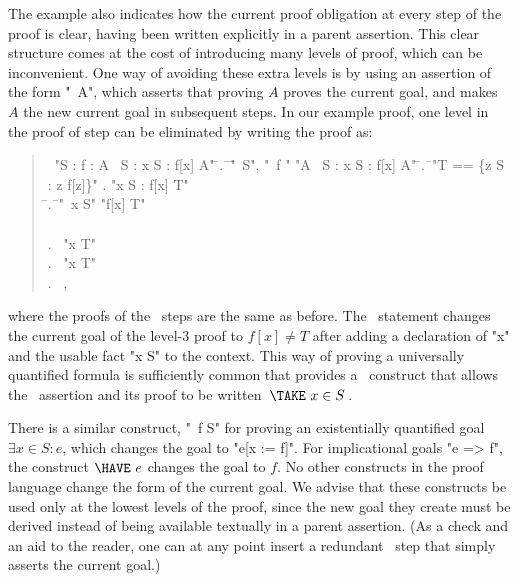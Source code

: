\documentclass[a4paper]{easychair}
\begin{document}
The example also indicates how the current proof obligation at every
step of the proof is clear, having been written explicitly in a parent
assertion.  This clear structure comes at the cost of introducing many
levels of proof, which can be inconvenient.  One way of avoiding these
extra levels is by using an assertion of the form "\SUFFICES\ A",
which asserts that proving $A$ proves the current goal, and makes $A$
the new current goal in subsequent steps.  In our example proof, one
level in the proof of step  can be eliminated by writing the proof
as:
\begin{quote} \small
  \begin{tabbing}
    \THEOREM\ "\forall S : \forall f \in [S -> \SUBSET\ S] : \exists A \in \SUBSET\ S : \forall x \in S : f[x] \neq A" \kill
    \PROOF \kill
    \LSP \= .\ \= \ASSUME \= "\NEW\ S", \kill
         \>        \>         \> "\NEW\ f \in [S -> \SUBSET\ S]" \kill
         \>        \> \PROVE "\exists A \in \SUBSET\ S : \forall x \in S : f[x] \neq A" \kill
         \>        \> \PROOF \kill
         \> \hspace{1em} \= .\ \= \DEFINE "T == \{z \in S : z \notin f[z]\}" \kill
         \>        \> .  \> "\forall x \in S : f[x] \neq T" \\
         \>        \>  \hspace{1em} \= .\ \= \SUFFICES \ASSUME "\NEW\ x \in S" \PROVE "f[x] \neq T" \\
         \>        \>        \> \hspace{1em} \PROOF \OBVIOUS \\
         \>        \>        \> .\ \> \CASE "x \in T" \\
         \>        \>        \> .\ \> \CASE "x \notin T" \\
         \>        \>        \> .\ \> \QED \BY {}, 
  \end{tabbing}
\end{quote}
where the proofs of the \CASE\ steps are the same as before.  The
\SUFFICES\ statement changes the current goal of the level-3 proof to
$f[x]\neq T$ after adding a declaration of "x" and the usable fact "x
\in S" to the context. This way of proving a universally quantified
formula is sufficiently common that \tlatwo provides a \TAKE\
construct that allows the \SUFFICES\ assertion  and its \OBVIOUS
proof to be written \mbox{\,$\TAKE\ x \in S$\,}. 

There is a similar construct, "\WITNESS\ f \in S" for proving an
existentially quantified goal $\exists x\in S: e$, which changes the
goal to "e[x := f]".
For implicational goals "e => f", the construct $\HAVE\ e$ changes the
goal to $f$.  No other constructs in the \tlatwo proof language change
the form of the current goal. We advise that these constructs be used
only at the lowest levels of the proof, since the new goal they create
must be derived instead of being available textually in a parent
assertion.  (As a check and an aid to the reader, one can at any point
insert a redundant \SUFFICES\ step that simply asserts the current
goal.)
\end{document}
